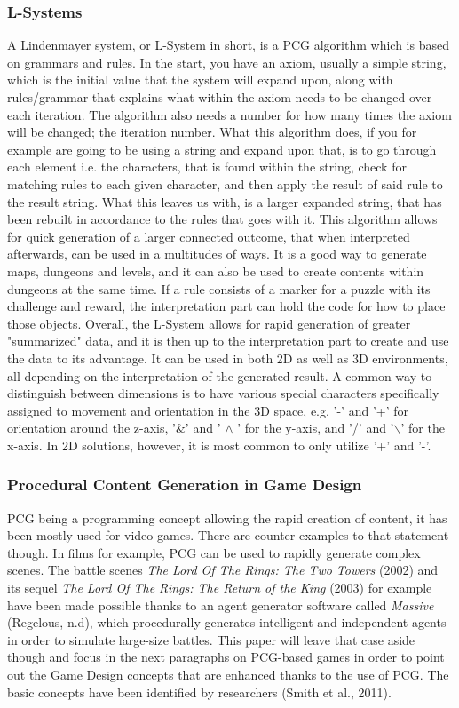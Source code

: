 \subsubsection{L-Systems}
A Lindenmayer system, or L-System in short, is a PCG algorithm which is based on grammars and rules. In the start, you have an axiom, usually a simple string, which is the initial value that the system will expand upon, along with rules/grammar that explains what within the axiom needs to be changed over each iteration. The algorithm also needs a number for how many times the axiom will be changed; the iteration number. What this algorithm does, if you for example are going to be using a string and expand upon that, is to go through each element i.e. the characters, that is found within the string, check for matching rules to each given character, and then apply the result of said rule to the result string.
What this leaves us with, is a larger expanded string, that has been rebuilt in accordance to the rules that goes with it. This algorithm allows for quick generation of a larger connected outcome, that when interpreted afterwards, can be used in a multitudes of ways. It is a good way to generate maps, dungeons and levels, and it can also be used to create contents within dungeons at the same time. If a rule consists of a marker for a puzzle with its challenge and reward, the interpretation part can hold the code for how to place those objects. 
Overall, the L-System allows for rapid generation of greater "summarized" data, and it is then up to the interpretation part to create and use the data to its advantage.
It can be used in both 2D as well as 3D environments, all depending on the interpretation of the generated result. A common way to distinguish between dimensions is to have various special characters specifically assigned to movement and orientation in the 3D space, e.g. '-' and '+' for orientation around the z-axis, '$\&$' and ' $\wedge$ ' for the y-axis, and '/' and '$\backslash$' for the x-axis. In 2D solutions, however, it is most common to only utilize '+' and '-'. 

\subsubsection{Procedural Content Generation in Game Design}
PCG being a programming concept allowing the rapid creation of content, it has been mostly used for video games. There are counter examples to that statement though. In films for example, PCG can be used to rapidly generate complex scenes. The battle scenes \textit{The Lord Of The Rings: The Two Towers} (2002)\cite{film:lotr2} and its sequel \textit{The Lord Of The Rings: The Return of the King} (2003)\cite{film:lotr3} for example have been made possible thanks to an agent generator software called \textit{Massive} (Regelous, n.d)\cite{soft:massive}, which procedurally generates intelligent and independent agents in order to simulate large-size battles. This paper will leave that case aside though and focus in the next paragraphs on PCG-based games in order to point out the Game Design concepts that are enhanced thanks to the use of PCG. The basic concepts have been identified by researchers (Smith et al., 2011)\cite{art:pcgbased}.

